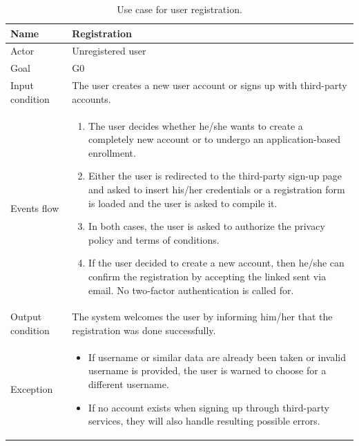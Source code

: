 \begin{table}[H]
\begin{center}
\begin{tabular}{| l | p{} |}
\hline
Name & Registration \\ \hline
Actor & Unregistered user \\ \hline
Goal & G0 \\ \hline
Input condition & The user creates a new user account or signs up with third-party accounts. \\ \hline
Events flow & \begin{enumerate}
	\item The user decides whether he/she wants to create a completely new account or to undergo an application-based enrollment.
	\item Either the user is redirected to the third-party sign-up page and asked to insert his/her credentials or a registration form is loaded and the user is asked to compile it.\label{load-registration}
	\item In both cases, the user is asked to authorize the privacy policy and terms of conditions.
	\item If the user decided to create a new account, then he/she can confirm the registration by accepting the linked sent via email. No two-factor authentication is called for.
	\end{enumerate}
\\
\hline
Output condition & The system welcomes the user by informing him/her that the registration was done successfully. \\
\hline

Exception &  \begin{itemize}
	\item If username or similar data are already been taken or invalid username is provided, the user is warned to choose for a different username.
   	\item If no account exists when signing up through third-party services, they will also handle resulting possible errors.
	\end{itemize}
 \\ \hline
\end{tabular}
\end{center}
\caption{Use case for user registration.}
\label{usecase-registration}
\end{table}

